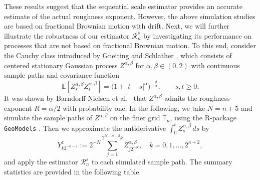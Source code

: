 \documentclass[12pt,reqno]{article}
\numberwithin{equation}{section}
\def\cR{{\mathscr R}}
\theoremstyle{definition}
\newcommand{\bE}{\mathbb{E}}
\newcommand{\bT}{\mathbb{T}}
\begin{document}
These results suggest that the sequential scale estimator provides an accurate estimate of the actual roughness exponent. However, the above simulation studies are based on fractional Brownian motion with drift. Next, we will further illustrate the robustness of our estimator $\cR^s_n$ by investigating its performance on processes that are not based on fractional Brownian motion. To this end, consider the Cauchy class introduced by Gneiting and Schlather \cite{Gneiting2004Hurst}, which consists of centered stationary Gaussian process $Z^{\alpha,\beta}$ for $\alpha,\beta \in (0,2)$ with continuous sample paths and covariance function 
\begin{equation*}
	\bE\left[Z^{\alpha,\beta}_sZ^{\alpha,\beta}_t\right] = \big(1 + |t-s|^\alpha\big)^{-\frac{\beta}{\alpha}}, \qquad s,t \ge 0.
\end{equation*}
It was shown by Barndorff-Nielsen et al.~\cite{Barndorff2009BSS} that $Z^{\alpha,\beta}$ admits the roughness exponent $R = \alpha/2$ with probability one. In the following, we take $N = n+5$ and simulate the sample paths of $Z^{\alpha,\beta}$ on the finer grid $\bT_n$, using the R-package  {\tt GeoModels} \cite{GM2024}. Then we approximate the antiderivative $\int_0^t Z^{\alpha,\beta}_s\,ds$ by 
\begin{equation*}
	Y^{z}_{k2^{-n-2}}:=2^{-N}\sum_{j = 1}^{2^{N-n-2}k}Z^{\alpha,\beta}_{j2^{-N}},\quad k=0,1,\dots, 2^{n+2},
\end{equation*}
and apply the estimator $\cR^s_n$ to each simulated sample path. The summary statistics are provided in the following table. 
\end{document}
